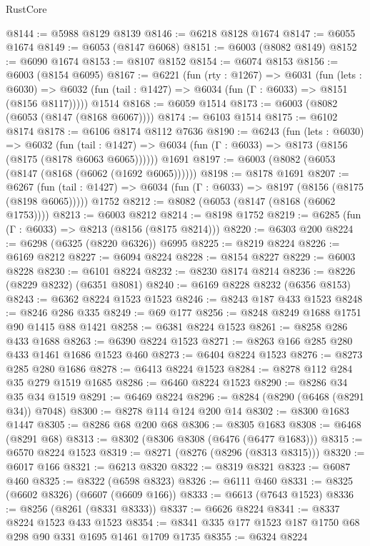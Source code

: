 \begin{lexlean}{RustCore}
\begin{coremodule}
@8144 := @5988 @8129 @8139
@8146 := @6218 @8128 @1674
@8147 := @6055 @1674
@8149 := @6053 (@8147 @6068)
@8151 := @6003 (@8082 @8149)
@8152 := @6090 @1674
@8153 := @8107 @8152
@8154 := @6074 @8153
@8156 := @6003 (@8154 @6095)
@8167 := @6221
    (fun (rty : @1267) =>
    @6031
      (fun (lets : @6030) =>
      @6032 (fun (tail : @1427) => @6034 (fun (Γ : @6033) => @8151 (@8156 @8117)))))
    @1514
@8168 := @6059 @1514
@8173 := @6003 (@8082 (@6053 (@8147 (@8168 @6067))))
@8174 := @6103 @1514
@8175 := @6102 @8174
@8178 := @6106 @8174 @8112 @7636
@8190 := @6243
    (fun (lets : @6030) =>
    @6032
      (fun (tail : @1427) => @6034 (fun (Γ : @6033) => @8173 (@8156 (@8175 (@8178 @6063 @6065))))))
    @1691
@8197 := @6003 (@8082 (@6053 (@8147 (@8168 (@6062 (@1692 @6065))))))
@8198 := @8178 @1691
@8207 := @6267
    (fun (tail : @1427) => @6034 (fun (Γ : @6033) => @8197 (@8156 (@8175 (@8198 @6065)))))
    @1752
@8212 := @8082 (@6053 (@8147 (@8168 (@6062 @1753))))
@8213 := @6003 @8212
@8214 := @8198 @1752
@8219 := @6285 (fun (Γ : @6033) => @8213 (@8156 (@8175 @8214)))
@8220 := @6303 @200
@8224 := @6298 (@6325 (@8220 @6326)) @6995
@8225 := @8219 @8224
@8226 := @6169 @8212
@8227 := @6094 @8224
@8228 := @8154 @8227
@8229 := @6003 @8228
@8230 := @6101 @8224
@8232 := @8230 @8174 @8214
@8236 := @8226 (@8229 @8232) (@6351 @8081)
@8240 := @6169 @8228 @8232 (@6356 @8153)
@8243 := @6362 @8224 @1523 @1523
@8246 := @8243 @187 @433 @1523
@8248 := @8246 @286 @335
@8249 := @69 @177
@8256 := @8248 @8249 @1688 @1751 @90 @1415 @88 @1421
@8258 := @6381 @8224 @1523
@8261 := @8258 @286 @433 @1688
@8263 := @6390 @8224 @1523
@8271 := @8263 @166 @285 @280 @433 @1461 @1686 @1523 @460
@8273 := @6404 @8224 @1523
@8276 := @8273 @285 @280 @1686
@8278 := @6413 @8224 @1523
@8284 := @8278 @112 @284 @35 @279 @1519 @1685
@8286 := @6460 @8224 @1523
@8290 := @8286 @34 @35 @34 @1519
@8291 := @6469 @8224
@8296 := @8284 (@8290 (@6468 (@8291 @34)) @7048)
@8300 := @8278 @114 @124 @200 @14
@8302 := @8300 @1683 @1447
@8305 := @8286 @68 @200 @68
@8306 := @8305 @1683
@8308 := @6468 (@8291 @68)
@8313 := @8302 (@8306 @8308 (@6476 (@6477 @1683)))
@8315 := @6570 @8224 @1523
@8319 := @8271 (@8276 (@8296 (@8313 @8315)))
@8320 := @6017 @166
@8321 := @6213 @8320
@8322 := @8319 @8321
@8323 := @6087 @460
@8325 := @8322 (@6598 @8323)
@8326 := @6111 @460
@8331 := @8325 (@6602 @8326) (@6607 (@6609 @166))
@8333 := @6613 (@7643 @1523)
@8336 := @8256 (@8261 (@8331 @8333))
@8337 := @6626 @8224
@8341 := @8337 @8224 @1523 @433 @1523
@8354 := @8341 @335 @177 @1523 @187 @1750 @68 @298 @90 @331 @1695 @1461 @1709 @1735
@8355 := @6324 @8224

\end{coremodule}
\end{lexlean}
